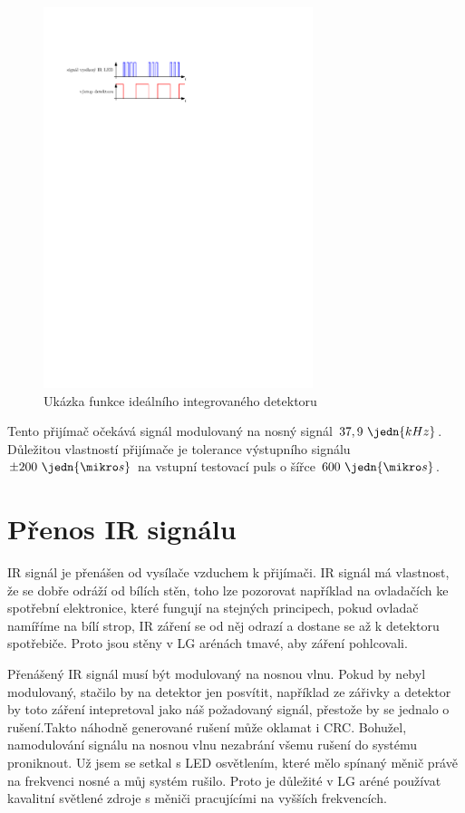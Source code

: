 \begin{figure}[H]
    \begin{center}
        \includegraphics[width=0.7\textwidth]{img/funkce-ir-detektoru}
    \end{center}
    \caption{Ukázka funkce ideálního integrovaného detektoru}
\end{figure}

Tento přijímač očekává signál modulovaný na nosný signál $37,9~\jedn{kHz}$. Důležitou vlastností přijímače je tolerance výstupního signálu $\pm 200~\jedn{\mikro s}$ na vstupní testovací puls o šířce $600~\jedn{\mikro s}$.

\section{Přenos IR signálu}
IR signál je přenášen od vysílače vzduchem k přijímači. IR signál má vlastnost, že se dobře odráží od bílích stěn, toho lze pozorovat například na ovladačích ke spotřební elektronice, které fungují na stejných principech, pokud ovladač namíříme na bílí strop, IR záření se od něj odrazí a dostane se až k detektoru spotřebiče. Proto jsou stěny v LG arénách tmavé, aby záření pohlcovali.

Přenášený IR signál musí být modulovaný na nosnou vlnu. Pokud by nebyl modulovaný, stačilo by na detektor jen posvítit, například ze zářivky a detektor by toto záření intepretoval jako náš požadovaný signál, přestože by se jednalo o rušení.Takto náhodně generované rušení může oklamat i CRC. Bohužel, namodulování signálu na nosnou vlnu nezabrání všemu rušení do systému proniknout. Už jsem se setkal s LED osvětlením, které mělo spínaný měnič právě na frekvenci nosné a můj systém rušilo. Proto je důležité v LG aréné používat kavalitní světlené zdroje s měniči pracujícími na vyšších frekvencích.

